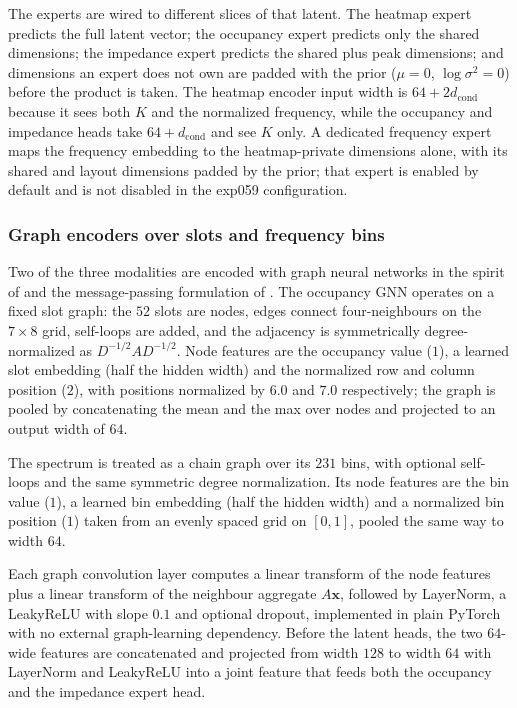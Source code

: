 The experts are wired to different slices of that latent. The heatmap expert
predicts the full latent vector; the occupancy expert predicts only the shared
dimensions; the impedance expert predicts the shared plus peak dimensions; and
dimensions an expert does not own are padded with the prior
($\mu = 0$, $\log \sigma^2 = 0$) before the product is taken. The heatmap encoder
input width is $64 + 2 d_{\mathrm{cond}}$ because it sees both $K$ and the
normalized frequency, while the occupancy and impedance heads take
$64 + d_{\mathrm{cond}}$ and see $K$ only. A dedicated frequency expert maps the
frequency embedding to the heatmap-private dimensions alone, with its shared and
layout dimensions padded by the prior; that expert is enabled by default and is
not disabled in the exp059 configuration.


\subsubsection*{Graph encoders over slots and frequency bins}

Two of the three modalities are encoded with graph neural networks in the spirit
of \cite{kipf2016graph} and the message-passing formulation of
\cite{gilmer2017message}. The occupancy GNN operates on a fixed slot graph: the
$52$ slots are nodes, edges connect four-neighbours on the $7 \times 8$ grid,
self-loops are added, and the adjacency is symmetrically degree-normalized as
$D^{-1/2} A D^{-1/2}$. Node features are the occupancy value ($1$), a learned
slot embedding (half the hidden width) and the normalized row and column
position ($2$), with positions normalized by $6.0$ and $7.0$ respectively; the
graph is pooled by concatenating the mean and the max over nodes and projected to
an output width of $64$.

The spectrum is treated as a chain graph over its $231$ bins, with optional
self-loops and the same symmetric degree normalization. Its node features are the
bin value ($1$), a learned bin embedding (half the hidden width) and a normalized
bin position ($1$) taken from an evenly spaced grid on $[0,1]$, pooled the same
way to width $64$.

Each graph convolution layer computes a linear transform of the node features
plus a linear transform of the neighbour aggregate $A\mathbf{x}$, followed by
LayerNorm, a LeakyReLU with slope $0.1$ and optional dropout, implemented in
plain PyTorch with no external graph-learning dependency. Before the latent
heads, the two $64$-wide features are concatenated and projected from width $128$
to width $64$ with LayerNorm and LeakyReLU into a joint feature that feeds both
the occupancy and the impedance expert head.

